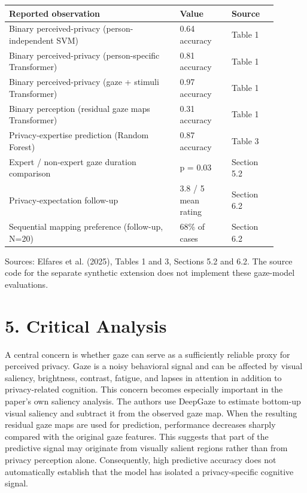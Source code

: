 \documentclass[11pt,a4paper]{article}
\begin{document}
\par\vspace{3pt}
{\footnotesize\begin{longtable}{@{}p{0.57\linewidth} p{0.17\linewidth} p{0.15\linewidth}@{}}
\toprule
\textbf{Reported observation} & \textbf{Value} & \textbf{Source} \\
\midrule
Binary perceived-privacy (person-independent SVM) & 0.64 accuracy & Table 1 \\
Binary perceived-privacy (person-specific Transformer) & 0.81 accuracy & Table 1 \\
Binary perceived-privacy (gaze + stimuli Transformer) & 0.97 accuracy & Table 1 \\
Binary perception (residual gaze maps Transformer) & 0.31 accuracy & Table 1 \\
Privacy-expertise prediction (Random Forest) & 0.87 accuracy & Table 3 \\
Expert / non-expert gaze duration comparison & p = 0.03 & Section 5.2 \\
Privacy-expectation follow-up & 3.8 / 5 mean rating & Section 6.2 \\
Sequential mapping preference (follow-up, N=20) & 68\% of cases & Section 6.2 \\
\bottomrule\end{longtable}}
Sources: Elfares et al. (2025), Tables 1 and 3, Sections 5.2 and 6.2. The source code for the separate synthetic extension does not implement these gaze-model evaluations.


\section*{5. Critical Analysis}

A central concern is whether gaze can serve as a sufficiently reliable proxy for perceived privacy. Gaze is a noisy behavioral signal and can be affected by visual saliency, brightness, contrast, fatigue, and lapses in attention in addition to privacy-related cognition. This concern becomes especially important in the paper's own saliency analysis. The authors use DeepGaze to estimate bottom-up visual saliency and subtract it from the observed gaze map. When the resulting residual gaze maps are used for prediction, performance decreases sharply compared with the original gaze features. This suggests that part of the predictive signal may originate from visually salient regions rather than from privacy perception alone. Consequently, high predictive accuracy does not automatically establish that the model has isolated a privacy-specific cognitive signal.
\end{document}
